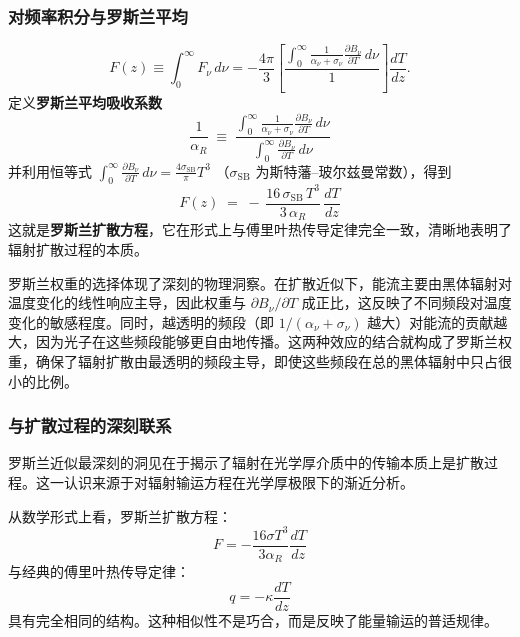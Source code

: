 \subsubsection*{对频率积分与罗斯兰平均}


\[
F(z) \equiv \int_0^\infty F_\nu\, d\nu
= -\frac{4\pi}{3}\left[
\frac{\displaystyle \int_0^\infty 
\frac{1}{\alpha_\nu+\sigma_\nu}\frac{\partial B_\nu}{\partial T}\, d\nu}
{\displaystyle 1}
\right]\frac{dT}{dz}.
\]
定义\textbf{罗斯兰平均吸收系数}
\[
\boxed{
\frac{1}{\alpha_R} \;\equiv\;
\frac{\displaystyle \int_0^\infty \frac{1}{\alpha_\nu+\sigma_\nu}
\frac{\partial B_\nu}{\partial T} \, d\nu}
{\displaystyle \int_0^\infty \frac{\partial B_\nu}{\partial T} \, d\nu}
}
\]
并利用恒等式
\(
\displaystyle \int_0^\infty \frac{\partial B_\nu}{\partial T}\, d\nu
= \frac{4\sigma_\mathrm{SB}}{\pi} T^3
\)
（$\sigma_\mathrm{SB}$ 为斯特藩–玻尔兹曼常数），得到
\[
\boxed{
F(z) \;=\; -\,\frac{16\,\sigma_\mathrm{SB}\, T^3}{3\,\alpha_R}\,\frac{dT}{dz}
}
\]
这就是\textbf{罗斯兰扩散方程}，它在形式上与傅里叶热传导定律完全一致，清晰地表明了辐射扩散过程的本质。

\begin{derivationnote}[罗斯兰权重的物理直觉]
罗斯兰权重的选择体现了深刻的物理洞察。在扩散近似下，能流主要由黑体辐射对温度变化的线性响应主导，因此权重与 $\partial B_\nu/\partial T$ 成正比，这反映了不同频段对温度变化的敏感程度。同时，越透明的频段（即 $1/(\alpha_\nu+\sigma_\nu)$ 越大）对能流的贡献越大，因为光子在这些频段能够更自由地传播。这两种效应的结合就构成了罗斯兰权重，确保了辐射扩散由最透明的频段主导，即使这些频段在总的黑体辐射中只占很小的比例。
\end{derivationnote}

\subsubsection*{与扩散过程的深刻联系}

罗斯兰近似最深刻的洞见在于揭示了辐射在光学厚介质中的传输本质上是扩散过程。这一认识来源于对辐射输运方程在光学厚极限下的渐近分析。



从数学形式上看，罗斯兰扩散方程：
\[
F = -\frac{16\sigma T^3}{3\alpha_R} \frac{dT}{dz}
\]
与经典的傅里叶热传导定律：
\[
q = -\kappa \frac{dT}{dz}
\]
具有完全相同的结构。这种相似性不是巧合，而是反映了能量输运的普适规律。

